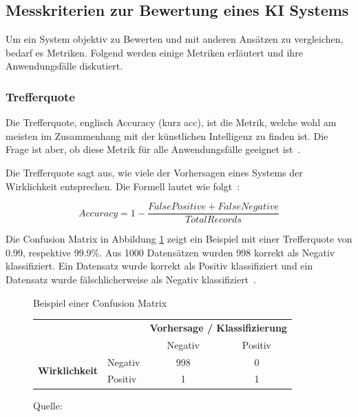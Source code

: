\subsection{Messkriterien zur Bewertung eines KI Systems}
\label{chap:metrices}

Um ein System objektiv zu Bewerten und mit anderen Ansätzen zu vergleichen, bedarf es Metriken. Folgend werden einige Metriken erläutert und ihre Anwendungsfälle diskutiert.

\subsubsection{Trefferquote}

Die Trefferquote, englisch Accuracy (kurz acc), ist die Metrik, welche wohl am meisten im Zusammenhang mit der künstlichen Intelligenz zu finden ist. Die Frage ist aber, ob diese Metrik für alle Anwendungsfälle geeignet ist~\autocite{TDSAccuracy}.

Die Trefferquote sagt aus, wie viele der Vorhersagen eines Systems der Wirklichkeit entsprechen. Die Formell lautet wie folgt~\autocite{TDSAccuracy}: 

$$Accuracy = 1 - \frac{False Positive + False Negative}{Total Records}$$

Die Confusion Matrix in Abbildung \ref{cm-sample} zeigt ein Beispiel mit einer Trefferquote von 0.99, respektive 99.9\%. Aus 1000 Datensätzen wurden 998 korrekt als Negativ klassifiziert. Ein Datensatz wurde korrekt als Positiv klassifiziert und ein Datensatz wurde fälschlicherweise als Negativ klassifiziert~\autocite{TDSAccuracy}.

\begin{figure}[h!]
    \centering
    \captionsetup{width=.9\linewidth}
    \caption{Beispiel einer Confusion Matrix}
    \label{cm-sample}
    \def\arraystretch{1.5}
    \begin{tabular}{llcc}
        \multicolumn{2}{l}{}                                                                       & \multicolumn{2}{c}{\textbf{Vorhersage / Klassifizierung}}   \\ \cline{3-4} 
        \multicolumn{1}{c}{\textbf{}}                               & \multicolumn{1}{l|}{}        & \multicolumn{1}{c|}{Negativ} & \multicolumn{1}{c|}{Positiv} \\ \cline{2-4} 
        \multicolumn{1}{l|}{\multirow{2}{*}{\textbf{Wirklichkeit}}} & \multicolumn{1}{l|}{Negativ} & \multicolumn{1}{c|}{998}    & \multicolumn{1}{c|}{0}       \\ \cline{2-4} 
        \multicolumn{1}{l|}{}                                       & \multicolumn{1}{l|}{Positiv} & \multicolumn{1}{c|}{1}       & \multicolumn{1}{c|}{1}       \\ \cline{2-4} 
    \end{tabular}
    \caption*{Quelle: \textcite{TDSAccuracy}}
\end{figure}

